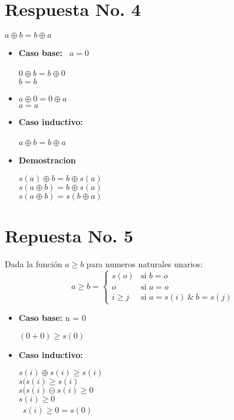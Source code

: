 \documentclass[10pt,a4paper]{article}
\begin{document}
\section*{Respuesta No. 4}
\begin{center}
$ a\oplus b = b\oplus a $
\end{center}
\begin{itemize}
\item\textbf{Caso base: } \ $ a=0 $
\begin{center}
 $ 0\oplus b = b\oplus 0$
  \
  \\ $ b=b $
\end{center}
\item{}
\begin{center}
$ a\oplus 0 = 0\oplus a$
  \
  \\ $ a=a $
\end{center}
\item\textbf{Caso inductivo: }
\\
\\
$ a\oplus b = b\oplus a $
\\
\item\textbf{Demostracion}
\begin{center}
$ s(a)\oplus b = b\oplus s(a) $
\\
$ s(a\oplus b) = b\oplus s(a) $
\\
$ s(a\oplus b) = s(b\oplus a) $
\end{center}
\end{itemize}
\section*{Repuesta No. 5}

Dada la funci\'on $a\geq b$ para numeros naturales unarios:
\[
        a\geq b =
                \left\{
                        \begin{array}{ll}
                                s(o)  & \mbox{si } b = o \\
                                o & \mbox{si } a = o \\
                                i\geq j & \mbox{si } a = s(i)\ \&\ b = s(j)
                        \end{array}
                \right.
\]
\begin{itemize}
\item\textbf{Caso base: } n = 0 
\begin{center}
$ (0+0) \geq s(0)  $
\end{center}
\item\textbf{Caso inductivo: }
\begin{center}
$ s(i)\oplus s(i) \geq s(i) $
\\
$ s(s(i)\geq s(i) $
\\
$ s(s(i)\ominus s(i)\geq 0 $
\\
$ s(i)\geq 0 $
\\
\
$ s(i)\geq 0 = s(0) $
\end{center}
\end{itemize}
\end{document}
